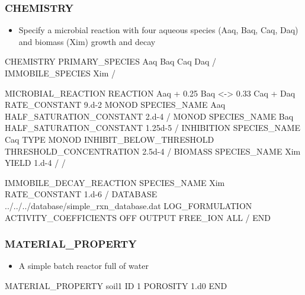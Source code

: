 \documentclass{beamer}
\begin{document}
\begin{frame}\frametitle{CHEMISTRY}

\begin{itemize}
  \item Specify a microbial reaction with four aqueous species (Aaq, Baq, Caq, Daq) and biomass (Xim) growth and decay
\end{itemize}

\begin{semiverbatim}

CHEMISTRY
  PRIMARY_SPECIES
    Aaq
    Baq
    Caq
    Daq
  /
  IMMOBILE_SPECIES
    Xim
  /
\end{semiverbatim}
\newpage
\scriptsize
\begin{semiverbatim}
  MICROBIAL_REACTION
    REACTION Aaq + 0.25 Baq <-> 0.33 Caq + Daq
    RATE_CONSTANT 9.d-2
    MONOD
      SPECIES_NAME Aaq
      HALF_SATURATION_CONSTANT 2.d-4
    /
    MONOD
      SPECIES_NAME Baq
      HALF_SATURATION_CONSTANT 1.25d-5
    /
    INHIBITION
      SPECIES_NAME Caq
      TYPE MONOD
      INHIBIT_BELOW_THRESHOLD
      THRESHOLD_CONCENTRATION 2.5d-4
    /
    BIOMASS
      SPECIES_NAME Xim
      YIELD 1.d-4
    /
  /
\end{semiverbatim}
\normalsize
\begin{semiverbatim}
  IMMOBILE_DECAY_REACTION
    SPECIES_NAME Xim
    RATE_CONSTANT 1.d-6
  /
  DATABASE ../../../database/simple_rxn_database.dat
  LOG_FORMULATION
  ACTIVITY_COEFFICIENTS OFF
  OUTPUT
    FREE_ION
    ALL
  /
END
\end{semiverbatim}

\end{frame}


\begin{frame}[fragile]\frametitle{MATERIAL\_PROPERTY}

\begin{itemize}
  \item A simple batch reactor full of water
\end{itemize}

\begin{semiverbatim}


MATERIAL_PROPERTY soil1
  ID 1
  POROSITY 1.d0
END
\end{semiverbatim}

\end{frame}
\end{document}
